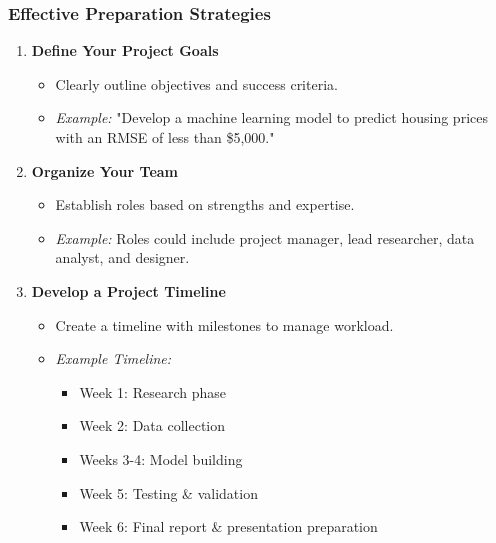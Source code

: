 \documentclass[aspectratio=169]{beamer}
\begin{document}
\begin{frame}[fragile]
\frametitle{Effective Preparation Strategies}

\begin{enumerate}
    \item \textbf{Define Your Project Goals}
        \begin{itemize}
            \item Clearly outline objectives and success criteria.
            \item \textit{Example:} "Develop a machine learning model to predict housing prices with an RMSE of less than \$5,000."
        \end{itemize}

    \item \textbf{Organize Your Team}
        \begin{itemize}
            \item Establish roles based on strengths and expertise.
            \item \textit{Example:} Roles could include project manager, lead researcher, data analyst, and designer.
        \end{itemize}
    
    \item \textbf{Develop a Project Timeline}
        \begin{itemize}
            \item Create a timeline with milestones to manage workload.
            \item \textit{Example Timeline:}
                \begin{itemize}
                    \item Week 1: Research phase
                    \item Week 2: Data collection
                    \item Weeks 3-4: Model building
                    \item Week 5: Testing \& validation
                    \item Week 6: Final report \& presentation preparation
                \end{itemize}
        \end{itemize}
\end{enumerate}
\end{frame}
\end{document}
